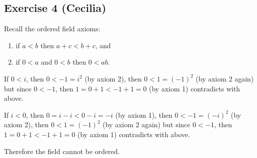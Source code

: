 \subsection*{Exercise 4 (Cecilia)}
Recall the ordered field axioms:

\begin{enumerate}
    \item if $ a < b $ then $ a + c < b + c $, and 
    \item if $ 0 < a $ and $ 0 < b $ then $ 0 < ab $.
\end{enumerate}

If $ 0 < i $, then $ 0 < -1 = i^2 $ (by axiom 2), then $ 0 < 1 = (-1)^2 $ (by axiom 2 again)
but since $ 0 < -1 $, then $ 1 = 0 + 1 < -1 + 1 = 0 $ (by axiom 1) contradicts with above.

If $ i < 0 $, then $ 0 = i - i < 0 - i = -i $ (by axiom 1), then $ 0 < -1 = (-i)^2 $ (by axiom 2), then $ 0 < 1 = (-1)^2 $ (by axiom 2 again)
but since $ 0 < -1 $, then $ 1 = 0 + 1 < -1 + 1 = 0 $ (by axiom 1) contradicts with above.

Therefore the field cannot be ordered.
